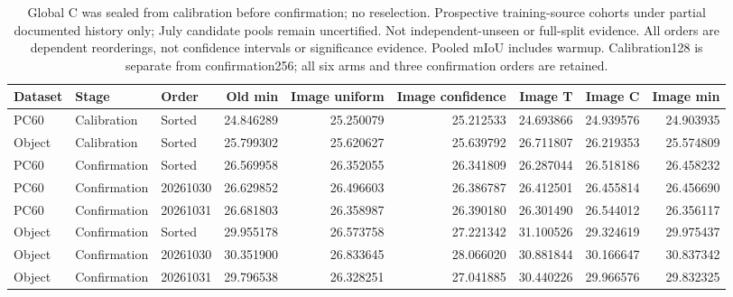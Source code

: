\begin{table}[t]
\caption{Global C was sealed from calibration before confirmation; no reselection. Prospective training-source cohorts under partial documented history only; July candidate pools remain uncertified. Not independent-unseen or full-split evidence. All orders are dependent reorderings, not confidence intervals or significance evidence. Pooled mIoU includes warmup. Calibration128 is separate from confirmation256; all six arms and three confirmation orders are retained.}
\centering\scriptsize
\begin{tabular}{@{}lllrrrrrr@{}}
\toprule
Dataset & Stage & Order & Old min & Image uniform & Image confidence & Image T & Image C & Image min \\
\midrule
PC60 & Calibration & Sorted & 24.846289 & 25.250079 & 25.212533 & 24.693866 & 24.939576 & 24.903935 \\
Object & Calibration & Sorted & 25.799302 & 25.620627 & 25.639792 & 26.711807 & 26.219353 & 25.574809 \\
PC60 & Confirmation & Sorted & 26.569958 & 26.352055 & 26.341809 & 26.287044 & 26.518186 & 26.458232 \\
PC60 & Confirmation & 20261030 & 26.629852 & 26.496603 & 26.386787 & 26.412501 & 26.455814 & 26.456690 \\
PC60 & Confirmation & 20261031 & 26.681803 & 26.358987 & 26.390180 & 26.301490 & 26.544012 & 26.356117 \\
Object & Confirmation & Sorted & 29.955178 & 26.573758 & 27.221342 & 31.100526 & 29.324619 & 29.975437 \\
Object & Confirmation & 20261030 & 30.351900 & 26.833645 & 28.066020 & 30.881844 & 30.166647 & 30.837342 \\
Object & Confirmation & 20261031 & 29.796538 & 26.328251 & 27.041885 & 30.440226 & 29.966576 & 29.832325 \\
\bottomrule
\end{tabular}
\end{table}

